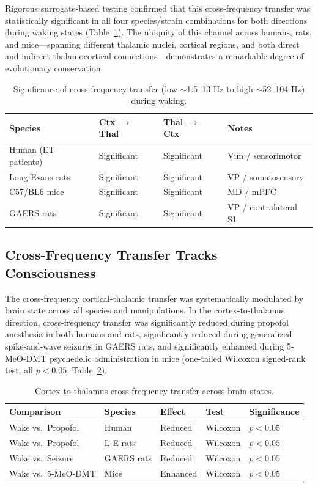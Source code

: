 \documentclass[12pt]{article}
\begin{document}
Rigorous surrogate-based testing confirmed that this cross-frequency transfer was statistically significant in all four species/strain combinations for both directions during waking states (Table~\ref{tab:significance}). The ubiquity of this channel across humans, rats, and mice---spanning different thalamic nuclei, cortical regions, and both direct and indirect thalamocortical connections---demonstrates a remarkable degree of evolutionary conservation.

\begin{table}[H]
\centering
\caption{Significance of cross-frequency transfer (low $\sim$1.5--13 Hz to high $\sim$52--104 Hz) during waking.}
\label{tab:significance}
\begin{tabular}{llll}
\toprule
Species & Ctx $\to$ Thal & Thal $\to$ Ctx & Notes \\
\midrule
Human (ET patients) & Significant & Significant & Vim / sensorimotor \\
Long-Evans rats & Significant & Significant & VP / somatosensory \\
C57/BL6 mice & Significant & Significant & MD / mPFC \\
GAERS rats & Significant & Significant & VP / contralateral S1 \\
\bottomrule
\end{tabular}
\end{table}

\subsection{Cross-Frequency Transfer Tracks Consciousness}

The cross-frequency cortical-thalamic transfer was systematically modulated by brain state across all species and manipulations. In the cortex-to-thalamus direction, cross-frequency transfer was significantly reduced during propofol anesthesia in both humans and rats, significantly reduced during generalized spike-and-wave seizures in GAERS rats, and significantly enhanced during 5-MeO-DMT psychedelic administration in mice (one-tailed Wilcoxon signed-rank test, all $p < 0.05$; Table~\ref{tab:ctx_thal}).

\begin{table}[H]
\centering
\caption{Cortex-to-thalamus cross-frequency transfer across brain states.}
\label{tab:ctx_thal}
\begin{tabular}{lllll}
\toprule
Comparison & Species & Effect & Test & Significance \\
\midrule
Wake vs.\ Propofol & Human & Reduced & Wilcoxon & $p < 0.05$ \\
Wake vs.\ Propofol & L-E rats & Reduced & Wilcoxon & $p < 0.05$ \\
Wake vs.\ Seizure & GAERS rats & Reduced & Wilcoxon & $p < 0.05$ \\
Wake vs.\ 5-MeO-DMT & Mice & Enhanced & Wilcoxon & $p < 0.05$ \\
\bottomrule
\end{tabular}
\end{table}
\end{document}
